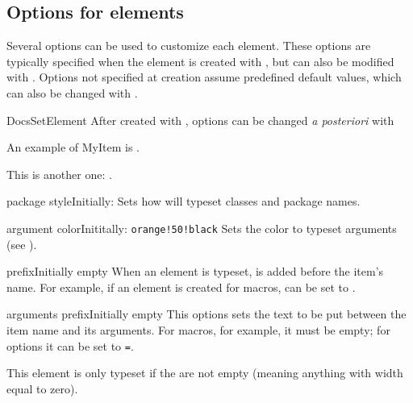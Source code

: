 \documentclass[11pt, outdir = ./out]{article}
\begin{document}
\subsection{Options for elements}\label{sec:options-for-elements}

Several options can be used to customize each element. These options are typically specified when the element is created with , but can also be modified with . Options not specified at creation assume predefined default values, which can also be changed with .

\begin{Macrodef}{DocsSetElement}{}{}
    After created with , options can be changed \textit{a posteriori} with 
\end{Macrodef}

\begin{DocsExample}
    An example of MyItem is .\par
    This is another one: .
\end{DocsExample}

\begin{Optiondef}{package style}{}{Initially: }
    Sets how  will typeset classes and package names.
\end{Optiondef}

\begin{Optiondef}{argument color}{}{Inititally: \texttt{orange!50!black}}
    Sets the color to typeset arguments (see ).
\end{Optiondef}

\begin{Optiondef}{prefix}{}{Initially empty}
    When an element is typeset,  is added before the item's name. For example, if an element is created for macros,  can be set to .
\end{Optiondef}

\begin{Optiondef}{arguments prefix}{}{Initially empty}
    This options sets the text to be put between the item name and its arguments. For macros, for example, it must be empty; for options it can be set to \texttt{=}.

    This element is only typeset if the  are not empty (meaning anything with width equal to zero).
\end{Optiondef}
\end{document}
